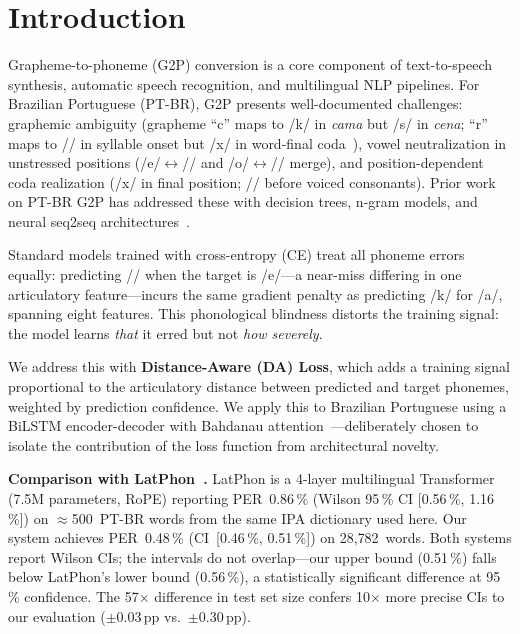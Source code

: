 \documentclass[conference]{IEEEtran}
\begin{document}
\section{Introduction}

Grapheme-to-phoneme (G2P) conversion is a core component of
text-to-speech synthesis, automatic speech recognition, and
multilingual NLP pipelines.
For Brazilian Portuguese (PT-BR), G2P presents well-documented
challenges: graphemic ambiguity (grapheme ``c'' maps to /k/ in
\textit{cama} but /s/ in \textit{cena}; ``r'' maps to
// in syllable onset but /x/ in word-final
coda~\cite{barbosa2004brazilian}), vowel neutralization in
unstressed positions (/e/$\leftrightarrow$// and
/o/$\leftrightarrow$// merge), and position-dependent
coda realization (/x/ in final position; // before
voiced consonants).
Prior work on PT-BR G2P has addressed these with decision trees,
n-gram models, and neural seq2seq
architectures~\cite{neto2006brazilian}.

Standard models trained with cross-entropy (CE) treat all phoneme
errors equally: predicting // when the target is /e/---a
near-miss differing in one articulatory feature---incurs the same
gradient penalty as predicting /k/ for /a/, spanning eight features.
This phonological blindness distorts the training signal: the model
learns \emph{that} it erred but not \emph{how severely}.

We address this with \textbf{Distance-Aware (DA) Loss}, which adds a
training signal proportional to the articulatory distance between
predicted and target phonemes, weighted by prediction confidence.
We apply this to Brazilian Portuguese using a BiLSTM encoder-decoder
with Bahdanau attention~\cite{bahdanau2014neural}---deliberately
chosen to isolate the contribution of the loss function from
architectural novelty.

\textbf{Comparison with LatPhon~\cite{chary2025latphon}.}
LatPhon is a 4-layer multilingual Transformer (7.5M parameters, RoPE)
reporting PER~0.86\,\% (Wilson 95\,\% CI [0.56\,\%, 1.16\,\%]) on
$\approx$500~PT-BR words from the same IPA dictionary used here.
Our system achieves PER~0.48\,\% (CI~[0.46\,\%, 0.51\,\%]) on
28{,}782~words.
Both systems report Wilson CIs; the intervals do not overlap---our
upper bound (0.51\,\%) falls below LatPhon's lower bound
(0.56\,\%), a statistically significant difference at 95\,\%
confidence.
The 57$\times$ difference in test set size confers 10$\times$ more
precise CIs to our evaluation ($\pm$0.03\,pp vs.\
$\pm$0.30\,pp).
\end{document}
